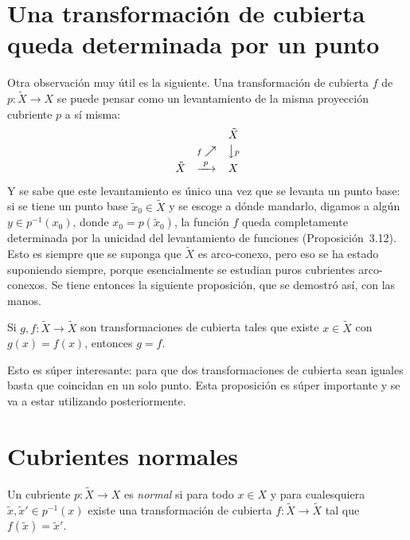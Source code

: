\documentclass[11pt]{article}
\begin{document}
\section*{Una transformación de cubierta queda determinada por un punto}

Otra observación muy útil es la siguiente. Una transformación de cubierta $f$ de $p\colon\tilde X\to X$ se puede pensar como un levantamiento de la misma proyección cubriente $p$ a sí misma:
\[
  \begin{array}{ccc}
    & & \tilde X\\[2pt]
    & {\scriptstyle f}\nearrow & \big\downarrow{\scriptstyle p}\\[2pt]
    \tilde X & \xrightarrow{\ p\ } & X
  \end{array}
\]
Y se sabe que este levantamiento es único una vez que se levanta un punto base: si se tiene un punto base $\tilde x_0\in\tilde X$ y se escoge a dónde mandarlo, digamos a algún $y\in p^{-1}(x_0)$, donde $x_0=p(\tilde x_0)$, la función $f$ queda completamente determinada por la unicidad del levantamiento de funciones (Proposición~3.12). Esto es siempre que se suponga que $\tilde X$ es arco-conexo, pero eso se ha estado suponiendo siempre, porque esencialmente se estudian puros cubrientes arco-conexos. Se tiene entonces la siguiente proposición, que se demostró así, con las manos.

\begin{prop}\label{prop:transf-punto}
Si $g,f\colon\tilde X\to\tilde X$ son transformaciones de cubierta tales que existe $x\in\tilde X$ con $g(x)=f(x)$, entonces $g=f$.
\end{prop}

Esto es súper interesante: para que dos transformaciones de cubierta sean iguales basta que coincidan en un solo punto. Esta proposición es súper importante y se va a estar utilizando posteriormente.

\section*{Cubrientes normales}

\begin{defn}\label{def:normal}
Un cubriente $p\colon\tilde X\to X$ es \emph{normal} si para todo $x\in X$ y para cualesquiera $\tilde x,\tilde x'\in p^{-1}(x)$ existe una transformación de cubierta $f\colon\tilde X\to\tilde X$ tal que $f(\tilde x)=\tilde x'$.
\end{defn}
\end{document}

